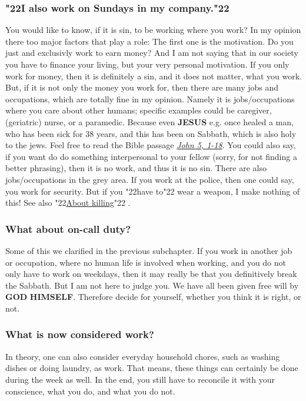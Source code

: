\documentclass[10pt,a5paper]{article}
\newcommand{\God}[0]{\textbf{GOD}}
\newcommand{\Himself}[0]{\textbf{HIMSELF}}
\newcommand{\Jesus}[0]{\textbf{JESUS}}
\newcommand{\q}[1]{\char"22{#1}\char"22 }
\begin{document}
	\subsubsection{\q{I also work on Sundays in my company.}}
		You would like to know,
		if it is sin,
		to be working where you work?
		In my opinion there too major factors that play a role:
		The first one is the motivation.
		Do you just and exclusivly work to earn money?
		And I am not saying that in our society you have to finance your living,
		but your very personal motivation.
		If you only work for money,
		then it is definitely a sin,
		and it does not matter,
		what you work.
		But,
		if it is not only the money you work for,
		then there are many jobs and occupations,
		which are totally fine in my opinion.
		Namely it is jobs/occupations where you care about other humans;
		specific examples could be
		caregiver,
		(geriatric) nurse,
		or a paramedic.
		Because even {\Jesus} e.g. once healed a man,
		who has been sick for 38 years,
		and this has been on Sabbath,
		which is also holy to the jews.
		Feel free to read the Bible passage \textit{\href{https://www.die-bibel.de/bibeln/online-bibeln/lesen/ESV/JHN.5/John-5}{John 5, 1-18}}.
		You could also say,
		if you want do do something interpersonal to your fellow
		(sorry,
		for not finding a better phrasing),
		then it is no work,
		and thus it is no sin.
		There are also jobs/occupations in the grey area.
		If you work at the police,
		then one could say,
		you work for security.
		But if you \q{have to} wear a weapon,
		I make nothing of this!
		See also \q{\hyperref[VomToeten]{About killing}}.

	\subsubsection{What about on-call duty?}
		Some of this we clarified in the previous subchapter.
		If you work in another job or occupation,
		where no human life is involved when working,
		and you do not only have to work on weekdays,
		then it may really be that you definitively break the Sabbath.
		But I am not here to judge you.
		We have all been given free will by {\God} {\Himself}.
		Therefore decide for yourself,
		whether you think it is right,
		or not.
		
	\subsubsection{What is now considered work?}
		In theory,
		one can also consider everyday household chores,
		such as washing dishes or doing laundry,
		as work.
		That means,
		these things can certainly be done during the week as well.
		In the end,
		you still have to reconcile it with your conscience,
		what you do,
		and what you do not.
\end{document}
